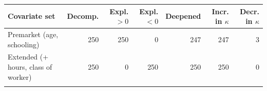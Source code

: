 \setlength{\tabcolsep}{3pt}
\begin{tabular}{@{}lrrrrrr@{}}
\toprule
Covariate set & Decomp. & Expl. $>0$ & Expl. $<0$ & Deepened & Incr. in $\kappa$ & Decr. in $\kappa$\\
\midrule
Premarket (age, schooling) & 250 & 250 & 0 & 247 & 247 & 3\\
Extended (+ hours, class of worker) & 250 & 0 & 250 & 250 & 250 & 0\\
\botrule
\end{tabular}
